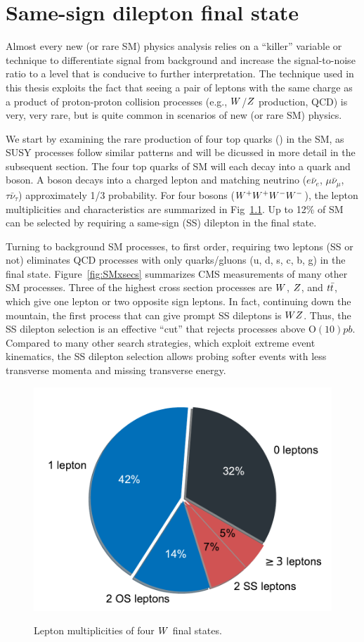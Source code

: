 \chapter{Same-sign dilepton final state}
\label{chap:ssdl}

Almost every new (or rare SM) physics analysis relies on a ``killer'' variable
or technique
to differentiate signal from background and increase the signal-to-noise
ratio to a level that is conducive to further interpretation.
The technique used in this thesis exploits the fact that seeing a pair of leptons
with the same charge as a product of proton-proton collision processes
(e.g., $W$/$Z$ production, QCD) is very, very rare,
but is quite common in scenarios of new (or rare SM) physics.

We start by examining the rare production of four top quarks (\tttt) in the SM,
as SUSY processes follow
similar patterns and will be dicussed in more detail in the subsequent section.
The four top quarks of SM \tttt will each decay into a \PQb quark and \PW boson.
A \PW boson decays into a charged lepton and matching neutrino 
($e\bar\nu_e$, $\mu\bar\nu_\mu$, $\tau\bar\nu_\tau$) approximately 1/3 probability.
For four \PW bosons ($W^+W^+W^-W^-$), the lepton multiplicities and characteristics are summarized in
Fig~\ref{fig:fourtoppie}. Up to 12\% of SM \tttt can be selected by requiring
a same-sign (SS) dilepton in the final state. 

Turning to background SM processes, to first order, requiring two leptons
(SS or not) eliminates QCD processes  with only quarks/gluons (u, d, s, c, b, g) in the final state.
Figure~\ref{fig:SMxsecs} summarizes
CMS measurements of many other SM processes.
Three of the highest cross section processes 
are $W$, $Z$, and $t\bar{t}$, which give one lepton or two opposite sign leptons.
In fact, continuing down the mountain, the first process that can give prompt
SS dileptons is $WZ$. Thus, the SS dilepton selection is an effective
``cut'' that rejects processes above $\mathrm{O}(10)\unit{pb}$. Compared to many other
search strategies, which exploit extreme event kinematics, the SS dilepton selection allows probing softer
events with less transverse momenta and missing transverse energy.




\begin{figure}[!hbtp]
\centering
\includegraphics[width=.50\textwidth]{figs/misc/fourtopdecay_pie.pdf} \\
\caption{Lepton multiplicities of four $W$ final states.}
\label{fig:fourtoppie}
\end{figure}

